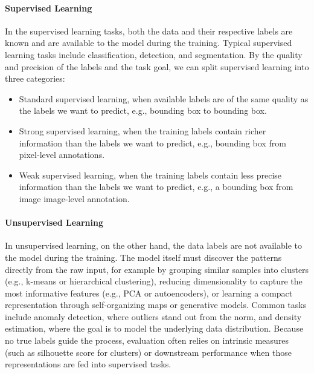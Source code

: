 \paragraph{Supervised Learning} In the supervised learning tasks, both the data and their respective labels are known and are available to the model during the training. Typical supervised learning tasks include classification, detection, and segmentation. By the quality and precision of the labels and the task goal, we can split supervised learning into three categories:

\begin{itemize}
    \item Standard supervised learning, when available labels are of the same quality as the labels we want to predict, e.g., bounding box to bounding box.
    \item Strong supervised learning, when the training labels contain richer information than the labels we want to predict, e.g., bounding box from pixel-level annotations.
    \item Weak supervised learning, when the training labels contain less precise information than the labels we want to predict, e.g., a bounding box from image image-level annotation.
\end{itemize}

\paragraph{Unsupervised Learning} 
In unsupervised learning, on the other hand, the data labels are not available to the model during the training. The model itself must discover the patterns directly from the raw input, for example by grouping similar samples into clusters (e.g., k-means or hierarchical clustering), reducing dimensionality to capture the most informative features (e.g., PCA or autoencoders), or learning a compact representation through self-organizing maps or generative models. Common tasks include anomaly detection, where outliers stand out from the norm, and density estimation, where the goal is to model the underlying data distribution. Because no true labels guide the process, evaluation often relies on intrinsic measures (such as silhouette score for clusters) or downstream performance when those representations are fed into supervised tasks.

